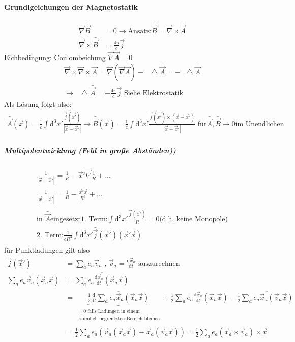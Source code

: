 \documentclass[a4paper]{article}
\newcommand*\laplace{\mathop{}\!\mathbin\bigtriangleup}
\begin{document}
\paragraph{Grundlgeichungen der Magnetostatik}
\begin{align}
\vec{\nabla}\bar{\vec{B}}&=0 \rightarrow \text{Ansatz:
}\bar{\vec{B}}=\vec{\nabla}\times \bar{\vec{A}}\\
\vec{\nabla}\times\bar{\vec{B}}&=\frac{4\pi}{c}\vec{j}
\end{align}
Eichbedingung: Coulombeichung $\vec{\nabla}\vec{A}=0$
\begin{align}
\vec{\nabla}\times\vec{\nabla}\times\bar{\vec{A}}=\vec{\nabla}(
\vec{\nabla}\bar{\vec{A}})-\laplace \bar{\vec{A}}=-\laplace \bar{\vec{A}}\\
\rightarrow \laplace \bar{\vec{A}}=-\frac{4\pi}{c}\bar{\vec{j}} \text{ Siehe
Elektrostatik}
\end{align}
Als Lösung folgt also:
\begin{align}
\bar{\vec{A}}(\vec{x})=\frac{1}{c}\int \mathrm{d}^3x' \frac{\bar{\vec{j}}(\vec{x'})}
{|\vec{x}-\vec{x}'|}
\rightarrow \bar{\vec{B}}(\vec{x})=\frac{1}{c}\int \mathrm{d}^3x'
\frac{\bar{\vec{j}}(\vec{x'})\times\left( \vec{x}-\vec{x}' \right)}
{|\vec{x}-\vec{x}'|} \text{  für} \bar{\vec{A}},\bar{\vec{B}}\rightarrow 0\text{
im Unendlichen}
\end{align}
\subparagraph{Multipolentwicklung (Feld in große Abständen))}
\begin{align}
\frac{1}{|\vec{x}-\vec{x}'|}=\frac{1}{R}-\vec{x}'\vec{\nabla}\frac{1}{R}+\ldots\\
\frac{1}{|\vec{x}-\vec{x}'|}=\frac{1}{R}-\frac{\vec{x}'\vec{x}}{R^3}+\ldots\\
\text{in }\bar{\vec{A}} \text{eingesetzt}
\text{1. Term:} \int \mathrm{d}^3 x' \frac{\bar{\vec{j}}(\vec{x}')}{R}=0
\text{(d.h. keine Monopole)}\\
\text{2. Term:} \frac{1}{cR^3}\int \mathrm{d}^3 x'\bar{\vec{j}}(\vec{x}')(\vec{x}'\vec{x})\\
\end{align}
für Punktladungen gilt also
\begin{align}
\vec{j}(\vec{x}')&=\sum_a e_a \vec{v}_a \text{ , }
\vec{v}_a=\frac{\mathrm{d}\vec{x}_a}{\mathrm{d}t} %
\text{ auszurechnen}\\
\overline{\sum_a e_a \vec{v}_a(\vec{x}_a\vec{x})} &=\overline{\sum_a e_a
\frac{\mathrm{d}\vec{x}_a}{\mathrm{d}t}(\vec{x}_a\vec{x})}\\
 &=\underbrace{\overline{\frac{1}{2}\frac{\mathrm{d}}{\mathrm{d}t}\sum_a e_a
\vec{x}_a(\vec{x}_a\vec{x})}}_{\substack{=0 \text{ falls Ladungen in einem}\\ \text{ räumlich
begrentzten Bereich bleiben}}} +\frac{1}{2}\overline{\sum_a e_a
\frac{\mathrm{d}\vec{x}_a}{\mathrm{d}t}(\vec{x}_a\vec{x})}-\frac{1}{2}\overline{\sum_a e_a \vec{x}_a
(\vec{v}_a\vec{x})}\\
 &=\frac{1}{2}\overline{\sum_a e_a \left( \vec{v}_a
(\vec{x}_a\vec{x})-\vec{x}_a
(\vec{v}_a\vec{x}) \right)}=\frac{1}{2}\sum_a e_a \overline{\left(
\vec{x}_a\times\vec{v}_a \right)\times\vec{x}}
\end{align}
\end{document}
